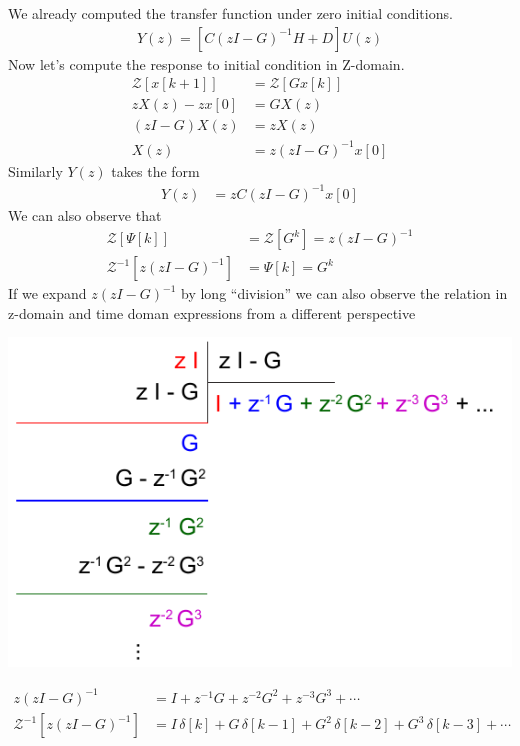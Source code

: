 \documentclass[twoside]{article}
\begin{document}
We already computed the transfer function under zero initial
conditions.
%
\begin{align*}
  Y(z) =  \left[ C \left(z I - G \right)^{-1} H + D \right] U(z)
\end{align*}
%
Now let's compute the response to initial condition in Z-domain.
%
\begin{align*}
\mathcal{Z} \left[ x[k+1] \right] &= \mathcal{Z} \left[ G x[k] \right]
\\
z X(z) - z x[0] &= G X(z)
\\
\left( z I - G \right) X(z) &= z X(z) 
\\
X(z) &= z \left( z I - G \right)^{-1} x[0]
\end{align*}
%
Similarly $Y(z)$ takes the form
%
\begin{align*}
  Y(z) &= z C \left( z I - G \right)^{-1} x[0]
\end{align*}
%
We can also observe that
%
\begin{align*}
  \mathcal{Z} \left[ \Psi[k] \right] &= \mathcal{Z} [ G^k ] =
  z \left( z I - G \right)^{-1}
\\
  \mathcal{Z}^{-1} [   z \left( z I - G \right)^{-1} ] &= \Psi[k] = G^k
\end{align*}
%
If we expand $z \left( z I - G \right)^{-1}$ by long ``division'' we
can also observe the relation in z-domain and time doman expressions
from a different perspective
%
     \begin{center}
 \begin{minipage}[h]{0.5\linewidth}
     \begin{center}
       \includegraphics[width=\textwidth]{directdivision}
     \end{center}
 \end{minipage}
     \end{center}
%
\begin{align*}
z \left( z I - G \right)^{-1} &= I + z^{-1} G + z^{-2} G^2 + z^{-3} G^3
  + \cdots
\\
\mathcal{Z}^{-1} \left[ z \left( z I - G \right)^{-1} \right] &=
I \, \delta[k] + G \, \delta[k-1] + G^2 \, \delta[k-2] + G^3 \,
  \delta[k-3] + \cdots 
\end{align*}
%
\end{document}
